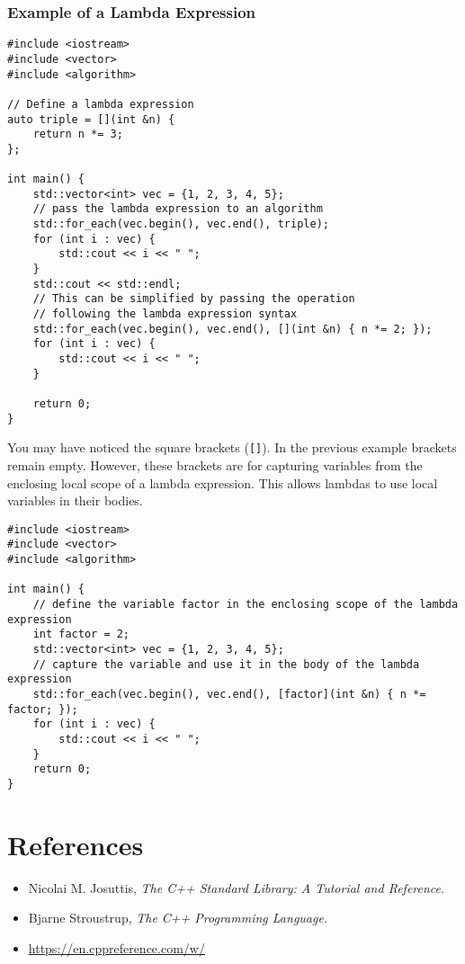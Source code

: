 \documentclass{article}
\begin{document}
\subsubsection{Example of a Lambda Expression}
\begin{verbatim}
#include <iostream>
#include <vector>
#include <algorithm>

// Define a lambda expression
auto triple = [](int &n) { 
    return n *= 3;
};

int main() {
	std::vector<int> vec = {1, 2, 3, 4, 5};
    // pass the lambda expression to an algorithm
    std::for_each(vec.begin(), vec.end(), triple);
    for (int i : vec) {
        std::cout << i << " ";
    }
	std::cout << std::endl;
    // This can be simplified by passing the operation
    // following the lambda expression syntax
    std::for_each(vec.begin(), vec.end(), [](int &n) { n *= 2; });
    for (int i : vec) {
        std::cout << i << " ";
    }
    
    return 0;
}
\end{verbatim}

You may have noticed the square brackets (\verb|[]|). In the previous example brackets remain empty. However, these brackets are for capturing variables from the enclosing local scope of a lambda expression. This allows lambdas to use local variables in their bodies.

\begin{verbatim}
#include <iostream>
#include <vector>
#include <algorithm>

int main() {
    // define the variable factor in the enclosing scope of the lambda expression
    int factor = 2;
    std::vector<int> vec = {1, 2, 3, 4, 5};
    // capture the variable and use it in the body of the lambda expression
    std::for_each(vec.begin(), vec.end(), [factor](int &n) { n *= factor; });
    for (int i : vec) {
        std::cout << i << " ";
    }
    return 0;
}
\end{verbatim}

\section{References}
\begin{itemize}
    \item Nicolai M. Josuttis, \textit{The C++ Standard Library: A Tutorial and Reference}.
    \item Bjarne Stroustrup, \textit{The C++ Programming Language}.
    \item \url{https://en.cppreference.com/w/}
\end{itemize}
\end{document}
